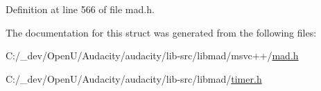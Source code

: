 Definition at line 566 of file mad.\+h.



The documentation for this struct was generated from the following files\+:\begin{DoxyCompactItemize}
\item 
C\+:/\+\_\+dev/\+Open\+U/\+Audacity/audacity/lib-\/src/libmad/msvc++/\hyperlink{lib-src_2libmad_2msvc_09_09_2mad_8h}{mad.\+h}\item 
C\+:/\+\_\+dev/\+Open\+U/\+Audacity/audacity/lib-\/src/libmad/\hyperlink{timer_8h}{timer.\+h}\end{DoxyCompactItemize}

